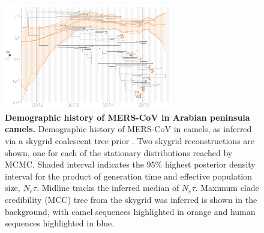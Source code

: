 \documentclass[11pt,oneside,letterpaper]{article}
\begin{document}
\begin{figure}[h]
\centering
	\includegraphics[width=0.65\textwidth]{figures/mers_skygrid.png}
	\caption{\textbf{Demographic history of MERS-CoV in Arabian peninsula camels.}
Demographic history of MERS-CoV in camels, as inferred via a skygrid coalescent tree prior \citep{gill_2013}.
Two skygrid reconstructions are shown, one for each of the stationary distributions reached by MCMC.
Shaded interval indicates the 95\% highest posterior density interval for the product of generation time and effective population size, $N_{e}\tau$.
Midline tracks the inferred median of $N_{e}\tau$.
Maximum clade credibility (MCC) tree from the skygrid was inferred is shown in the background, with camel sequences highlighted in orange and human sequences highlighted in blue.
	}
	\label{skygrid}
\end{figure}
\end{document}

